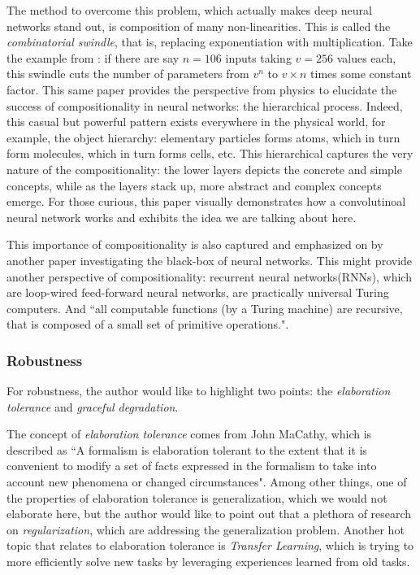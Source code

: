 \documentclass[letterpaper,10pt]{article}
\theoremstyle{definition}
\begin{document}
The method to overcome this problem, which actually makes deep neural networks
stand out, is composition of many non-linearities. This is called the
\emph{combinatorial swindle}\cite{lin2016does}, that is, replacing exponentiation
with multiplication. Take the example from \cite{lin2016does}: if there are say
$n = 106$ inputs taking $v = 256$ values each, this swindle cuts the number of
parameters from $v^n$ to $v \times n$ times some constant factor. This same paper
provides the perspective from physics to elucidate the success of 
compositionality in neural networks: the hierarchical process. Indeed, this
casual but powerful pattern exists everywhere in the physical world, for
example, the object hierarchy: elementary particles forms atoms, which in turn
form molecules, which in turn forms cells, etc. This hierarchical captures the
very nature of the compositionality: the lower layers depicts the concrete and
simple concepts, while as the layers stack up, more abstract and complex concepts
emerge. For those curious, this paper\cite{zeiler2014visualizing} visually
demonstrates how a convolutinoal neural network works and exhibits the idea we
are talking about here.

This importance of compositionality is also captured and emphasized on by another
paper\cite{poggio2017and} investigating the black-box of neural networks. This
might provide another perspective of compositionality: recurrent neural networks(RNNs),
which are loop-wired feed-forward neural networks, are practically universal
Turing computers. And ``all computable functions (by a Turing machine) are
recursive, that is composed of a small set of primitive operations."\cite{poggio2017and}.

\subsubsection{Robustness}

For robustness, the author would like to highlight two points: the \emph{elaboration
tolerance} and \emph{graceful degradation}.

The concept of \emph{elaboration tolerance} comes from John MaCathy, which is
described as ``A formalism is elaboration tolerant to the extent that it is convenient to modify a set of facts expressed in the formalism to take into account
new phenomena or changed circumstances"\cite{mccarthy1998elaboration}.
Among other things, one of the properties of elaboration tolerance
is generalization, which we would not elaborate here, but the author would like to point
out that a plethora of research on \emph{regularization}\cite{zhang2016understanding}, which
are addressing the generalization problem.
Another hot topic that relates to elaboration tolerance is \emph{Transfer Learning}\cite{pan2010survey}, which is trying to more efficiently solve new tasks by
leveraging experiences learned from old tasks.
\end{document}
